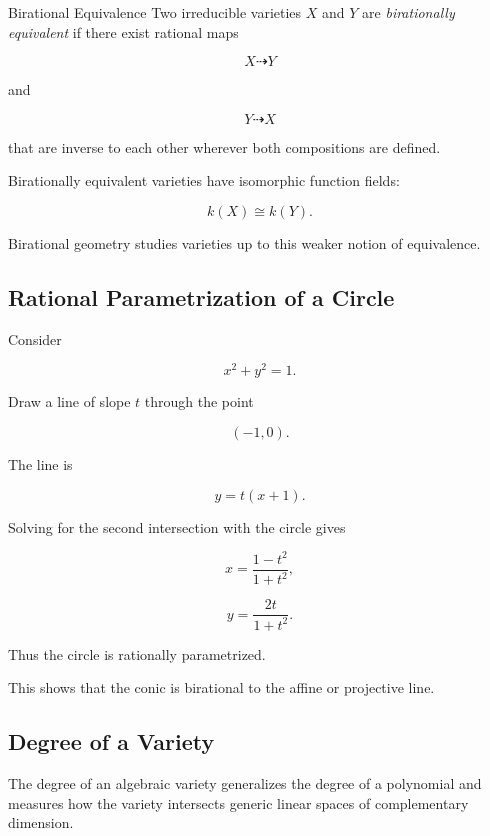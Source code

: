 \begin{definitionbox}{Birational Equivalence}
Two irreducible varieties \(X\) and \(Y\) are \emph{birationally equivalent}
if there exist rational maps

\[
X\dashrightarrow Y
\]

and

\[
Y\dashrightarrow X
\]

that are inverse to each other wherever both compositions are defined.
\end{definitionbox}

Birationally equivalent varieties have isomorphic function fields:

\[
\boxed{
k(X)\cong k(Y).
}
\]

Birational geometry studies varieties up to this weaker notion of
equivalence.

\subsection{Rational Parametrization of a Circle}
\label{subsec:rational-parametrization-circle}

Consider

\[
x^2+y^2=1.
\]

Draw a line of slope \(t\) through the point

\[
(-1,0).
\]

The line is

\[
y=t(x+1).
\]

Solving for the second intersection with the circle gives

\[
\boxed{
x=\frac{1-t^2}{1+t^2},
}
\]

\[
\boxed{
y=\frac{2t}{1+t^2}.
}
\]

Thus the circle is rationally parametrized.

This shows that the conic is birational to the affine or projective line.

\subsection{Degree of a Variety}
\label{subsec:degree-variety}

The degree of an algebraic variety generalizes the degree of a polynomial
and measures how the variety intersects generic linear spaces of
complementary dimension.

